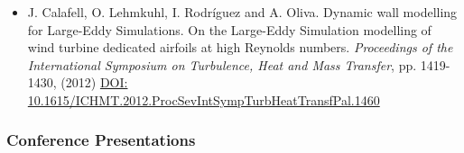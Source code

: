 \documentclass{article}
\begin{document}
\begin{itemize}
\item J. Calafell, O. Lehmkuhl, I. Rodríguez and A. Oliva. Dynamic wall modelling for Large-Eddy Simulations. On the Large-Eddy Simulation modelling of wind turbine dedicated airfoils at high Reynolds numbers. {\it Proceedings of the International Symposium on Turbulence, Heat and Mass Transfer}, pp. 1419-1430, (2012) \href{DOI: 10.1615/ICHMT.2012.ProcSevIntSympTurbHeatTransfPal.1460}{DOI: 10.1615/ICHMT.2012.ProcSevIntSympTurbHeatTransfPal.1460}

\end{itemize}

\subsubsection{Conference Presentations}
\end{document}

